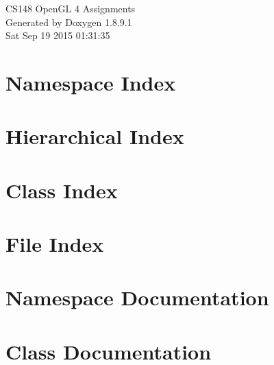 \documentclass[twoside]{book}
\newcommand{\+}{\discretionary{\mbox{\scriptsize$\hookleftarrow$}}{}{}}
\newcommand{\clearemptydoublepage}{%
  \newpage{\pagestyle{empty}\cleardoublepage}%
}
\begin{document}
\hypersetup{pageanchor=false,
             bookmarks=true,
             bookmarksnumbered=true,
             pdfencoding=unicode
            }
\begin{titlepage}
\vspace*{7cm}
\begin{center}%
{\Large C\+S148 Open\+G\+L 4 Assignments }\\
\vspace*{1cm}
{\large Generated by Doxygen 1.8.9.1}\\
\vspace*{0.5cm}
{\small Sat Sep 19 2015 01:31:35}\\
\end{center}
\end{titlepage}
\clearemptydoublepage
\tableofcontents
\clearemptydoublepage
{}
\hypersetup{pageanchor=true}

\chapter{Namespace Index}

\chapter{Hierarchical Index}

\chapter{Class Index}

\chapter{File Index}

\chapter{Namespace Documentation}



\chapter{Class Documentation}



















\end{document}
